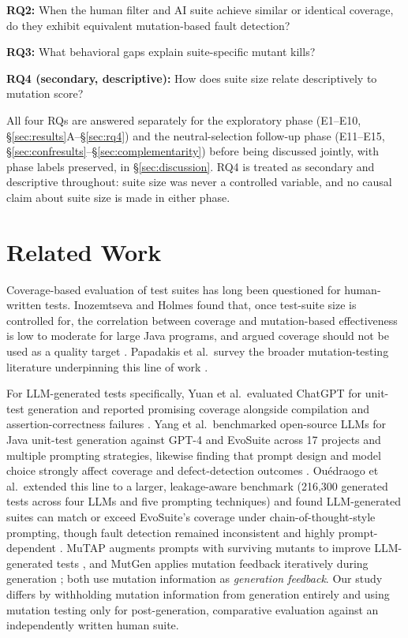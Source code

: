 \documentclass[10pt,conference]{IEEEtran}
\begin{document}
\textbf{RQ2:} When the human filter and AI suite achieve similar or identical coverage, do they exhibit equivalent mutation-based fault detection?

\textbf{RQ3:} What behavioral gaps explain suite-specific mutant kills?

\textbf{RQ4 (secondary, descriptive):} How does suite size relate descriptively to mutation score?

All four RQs are answered separately for the exploratory phase (E1--E10, \S\ref{sec:results}A--\S\ref{sec:rq4}) and the neutral-selection follow-up phase (E11--E15, \S\ref{sec:confresults}--\S\ref{sec:complementarity}) before being discussed jointly, with phase labels preserved, in \S\ref{sec:discussion}. RQ4 is treated as secondary and descriptive throughout: suite size was never a controlled variable, and no causal claim about suite size is made in either phase.

\section{Related Work}
Coverage-based evaluation of test suites has long been questioned for human-written tests. Inozemtseva and Holmes found that, once test-suite size is controlled for, the correlation between coverage and mutation-based effectiveness is low to moderate for large Java programs, and argued coverage should not be used as a quality target \cite{inozemtseva2014}. Papadakis et al.\ survey the broader mutation-testing literature underpinning this line of work \cite{papadakis2019survey}.

For LLM-generated tests specifically, Yuan et al.\ evaluated ChatGPT for unit-test generation and reported promising coverage alongside compilation and assertion-correctness failures \cite{yuan2023}. Yang et al.\ benchmarked open-source LLMs for Java unit-test generation against GPT-4 and EvoSuite across 17 projects and multiple prompting strategies, likewise finding that prompt design and model choice strongly affect coverage and defect-detection outcomes \cite{yang2024ase}. Ouédraogo et al.\ extended this line to a larger, leakage-aware benchmark (216{,}300 generated tests across four LLMs and five prompting techniques) and found LLM-generated suites can match or exceed EvoSuite's coverage under chain-of-thought-style prompting, though fault detection remained inconsistent and highly prompt-dependent \cite{ouedraogo2024}. MuTAP augments prompts with surviving mutants to improve LLM-generated tests \cite{mutap2024}, and MutGen applies mutation feedback iteratively during generation \cite{mutgen2026}; both use mutation information as \emph{generation feedback}. Our study differs by withholding mutation information from generation entirely and using mutation testing only for post-generation, comparative evaluation against an independently written human suite.
\end{document}
